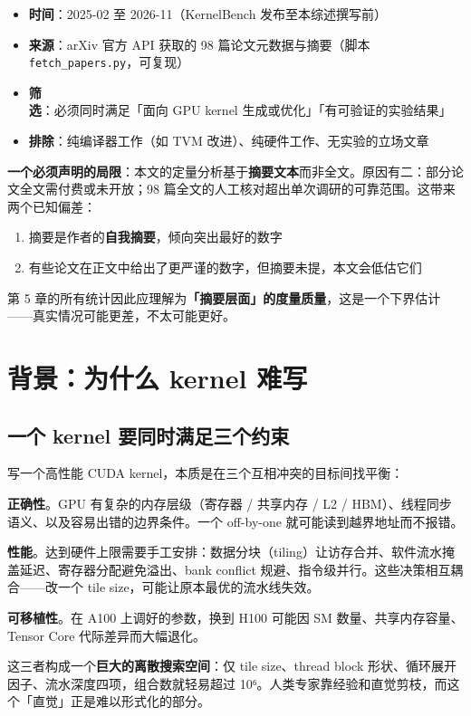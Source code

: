 \begin{itemize}
  \item \textbf{时间}：2025-02 至 2026-11（KernelBench 发布至本综述撰写前）
  \item \textbf{来源}：arXiv 官方 API 获取的 98 篇论文元数据与摘要（脚本 \texttt{fetch\_papers.py}，可复现）
  \item \textbf{筛选}：必须同时满足「面向 GPU kernel 生成或优化」「有可验证的实验结果」
  \item \textbf{排除}：纯编译器工作（如 TVM 改进）、纯硬件工作、无实验的立场文章
\end{itemize}

 \textbf{一个必须声明的局限}：本文的定量分析基于\textbf{摘要文本}而非全文。原因有二：部分论文全文需付费或未开放；98 篇全文的人工核对超出单次调研的可靠范围。这带来两个已知偏差：


\begin{enumerate}
  \item 摘要是作者的\textbf{自我摘要}，倾向突出最好的数字
  \item 有些论文在正文中给出了更严谨的数字，但摘要未提，本文会低估它们
\end{enumerate}

第 5 章的所有统计因此应理解为\textbf{「摘要层面」的度量质量}，这是一个下界估计——真实情况可能更差，不太可能更好。


\section{背景：为什么 kernel 难写}

\subsection{一个 kernel 要同时满足三个约束}

写一个高性能 CUDA kernel，本质是在三个互相冲突的目标间找平衡：


\textbf{正确性}。GPU 有复杂的内存层级（寄存器 / 共享内存 / L2 / HBM）、线程同步语义、以及容易出错的边界条件。一个 off-by-one 就可能读到越界地址而不报错。


\textbf{性能}。达到硬件上限需要手工安排：数据分块（tiling）让访存合并、软件流水掩盖延迟、寄存器分配避免溢出、bank conflict 规避、指令级并行。这些决策相互耦合——改一个 tile size，可能让原本最优的流水线失效。


\textbf{可移植性}。在 A100 上调好的参数，换到 H100 可能因 SM 数量、共享内存容量、Tensor Core 代际差异而大幅退化。


这三者构成一个\textbf{巨大的离散搜索空间}：仅 tile size、thread block 形状、循环展开因子、流水深度四项，组合数就轻易超过 10⁶。人类专家靠经验和直觉剪枝，而这个「直觉」正是难以形式化的部分。


